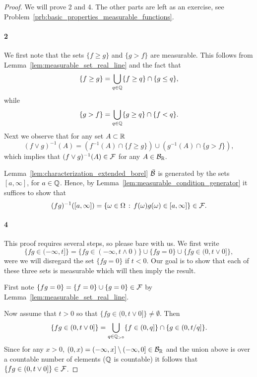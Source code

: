 \begin{proof}
We will prove 2 and 4. The other parts are left as an exercise, see Problem~\ref{prb:basic_properties_measurable_functions}.

\paragraph{2} We first note that the sets $\{f \ge g\}$ and $\{g > f\}$ are measurable. This follows from Lemma~\ref{lem:measurable_set_real_line} and the fact that
\[
	\{f \ge g\} = \bigcup_{q \in \mathbb Q} \{f \ge q\} \cap \{g \le q\},
\]
while
\[
	\{g > f\} = \bigcup_{q \in \mathbb Q} \{g \ge q\} \cap \{f < q\}.
\]
Next we observe that for any set $A \subset \mathbb R$
\[
	(f \vee g)^{-1}(A) = \left(f^{-1}(A) \cap \{f \ge g\}\right) \cup \left(g^{-1}(A) \cap \{g > f\}\right),
\]
which implies that $(f \vee g)^{-1}(A) \in \mathcal F$ for any $A \in \mathcal B_{\mathbb R}$.

Lemma~\ref{lem:characterization_extended_borel} $\bar{\mathcal B}$ is generated by the sets $[a,\infty]$, for $a \in \mathbb Q$. Hence, by Lemma~\ref{lem:measurable_condition_generator} it suffices to show that 
\[
	(fg)^{-1}([a,\infty]) = \{\omega \in \Omega \, : \, f(\omega) g(\omega) \in [a, \infty]\} \in \mathcal F.
\]

\paragraph{4} This proof requires several steps, so please bare with us. We first write
\[
	\{fg \in (-\infty, t]\} = \{fg \in (-\infty, t \wedge 0)\} \cup \{fg = 0\} \cup \{fg \in (0,t \vee 0]\},
\]
were we will disregard the set $\{fg = 0\}$ if $t < 0$. Our goal is to show that each of these three sets is measurable which will then imply the result.

First note $\{fg = 0\} = \{f = 0\} \cup \{g = 0\} \in \mathcal F$ by Lemma~\ref{lem:measurable_set_real_line}.

Now assume that $t > 0$ so that $\{fg \in (0,t \vee 0]\} \ne \emptyset$. Then
\[
	\{fg \in (0,t \vee 0]\} = \bigcup_{q \in \mathbb Q_{>0}} \{f \in (0,q]\} \cap \{g \in (0,t/q]\}.
\]
Since for any $x >0$, $(0,x) = (-\infty,x] \setminus (-\infty,0] \in \mathcal B_{\mathbb R}$ and the union above is over a countable number of elements ($\mathbb Q$ is countable) it follows that $\{fg \in (0,t \vee 0]\} \in \mathcal F$.


\end{proof}
